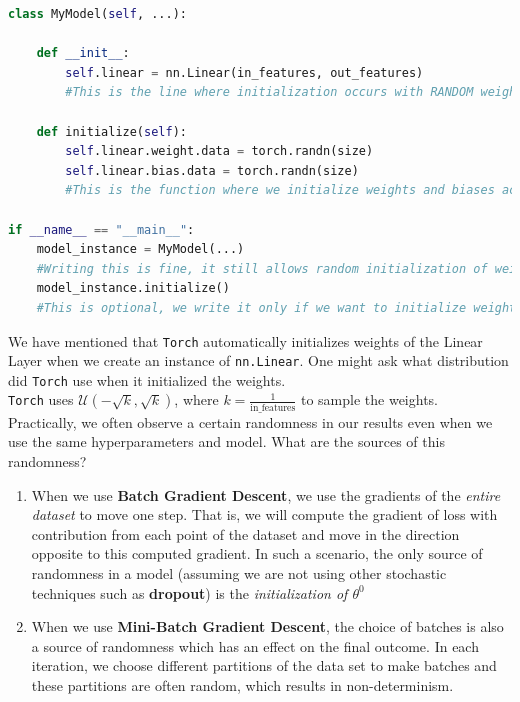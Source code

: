 \documentclass[12pt]{article}
\begin{document}
\begin{itemize}
\begin{lstlisting}[language=Python]
class MyModel(self, ...):
    
    def __init__:
        self.linear = nn.Linear(in_features, out_features)  
        #This is the line where initialization occurs with RANDOM weights
        
    def initialize(self):
        self.linear.weight.data = torch.randn(size)
        self.linear.bias.data = torch.randn(size)
        #This is the function where we initialize weights and biases according to the distribution of our choice
        
if __name__ == "__main__":
    model_instance = MyModel(...)
    #Writing this is fine, it still allows random initialization of weights
    model_instance.initialize()
    #This is optional, we write it only if we want to initialize weights with a distribution of our choice
\end{lstlisting}

We have mentioned that \texttt{Torch} automatically initializes weights of the Linear Layer when we create an instance of \texttt{nn.Linear}. One might ask what distribution did \texttt{Torch} use when it initialized the weights. \\
\texttt{Torch} uses $\mathcal{U}(-\sqrt{k}, \sqrt{k})$, where $k = \frac{1}{\text{in\_features}}$ to sample the weights. \\
Practically, we often observe a certain randomness in our results even when we use the same hyperparameters and model. What are the sources of this randomness?
\begin{enumerate}
    \item When we use \textbf{Batch Gradient Descent}, we use the gradients of the \textit{entire dataset} to move one step. That is, we will compute the gradient of loss with contribution from each point of the dataset and move in the direction opposite to this computed gradient. In such a scenario, the only source of randomness in a model (assuming we are not using other stochastic techniques such as \textbf{dropout}) is the \textit{initialization of $\theta^0$}
    \item When we use \textbf{Mini-Batch Gradient Descent}, the choice of batches is also a source of randomness which has an effect on the final outcome. In each iteration, we choose different partitions of the data set to make batches and these partitions are often random, which results in non-determinism. 
\end{enumerate}
    \end{itemize}
\end{document}
